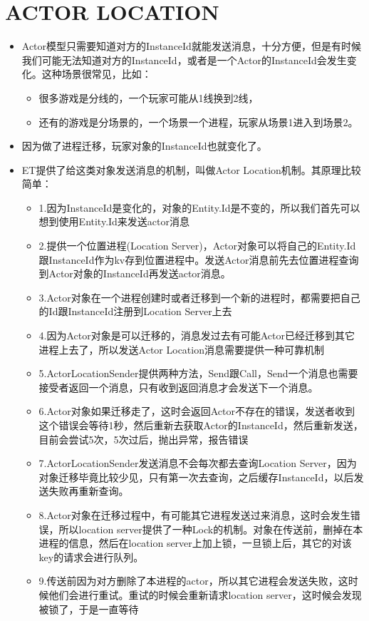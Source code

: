 \documentclass[9pt, b5paper]{article}
\begin{document}
\section{ACTOR LOCATION}
\label{sec-27}
\begin{itemize}
\item Actor模型只需要知道对方的InstanceId就能发送消息，十分方便，但是有时候我们可能无法知道对方的InstanceId，或者是一个Actor的InstanceId会发生变化。这种场景很常见，比如：
\begin{itemize}
\item 很多游戏是分线的，一个玩家可能从1线换到2线，
\item 还有的游戏是分场景的，一个场景一个进程，玩家从场景1进入到场景2。
\end{itemize}
\item 因为做了进程迁移，玩家对象的InstanceId也就变化了。
\item ET提供了给这类对象发送消息的机制，叫做Actor Location机制。其原理比较简单：
\begin{itemize}
\item 1.因为InstanceId是变化的，对象的Entity.Id是不变的，所以我们首先可以想到使用Entity.Id来发送actor消息
\item 2.提供一个位置进程(Location Server)，Actor对象可以将自己的Entity.Id跟InstanceId作为kv存到位置进程中。发送Actor消息前先去位置进程查询到Actor对象的InstanceId再发送actor消息。
\item 3.Actor对象在一个进程创建时或者迁移到一个新的进程时，都需要把自己的Id跟InstanceId注册到Location Server上去
\item 4.因为Actor对象是可以迁移的，消息发过去有可能Actor已经迁移到其它进程上去了，所以发送Actor Location消息需要提供一种可靠机制
\item 5.ActorLocationSender提供两种方法，Send跟Call，Send一个消息也需要接受者返回一个消息，只有收到返回消息才会发送下一个消息。
\item 6.Actor对象如果迁移走了，这时会返回Actor不存在的错误，发送者收到这个错误会等待1秒，然后重新去获取Actor的InstanceId，然后重新发送，目前会尝试5次，5次过后，抛出异常，报告错误
\item 7.ActorLocationSender发送消息不会每次都去查询Location Server，因为对象迁移毕竟比较少见，只有第一次去查询，之后缓存InstanceId，以后发送失败再重新查询。
\item 8.Actor对象在迁移过程中，有可能其它进程发送过来消息，这时会发生错误，所以location server提供了一种Lock的机制。对象在传送前，删掉在本进程的信息，然后在location server上加上锁，一旦锁上后，其它的对该key的请求会进行队列。
\item 9.传送前因为对方删除了本进程的actor，所以其它进程会发送失败，这时候他们会进行重试。重试的时候会重新请求location server，这时候会发现被锁了，于是一直等待

\end{itemize}
\end{itemize}
\end{document}

